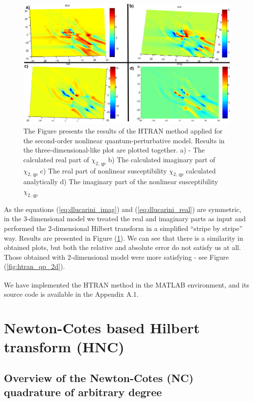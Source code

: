 \documentclass[12pt,twoside,a4paper]{article}
\numberwithin{equation}{subsection}
\numberwithin{figure}{subsection}
\begin{document}
\begin{figure}
  \includegraphics[width=150mm]{img/htran_qp_3d.png}
  \caption{The Figure presents the results of the HTRAN method applied for the second-order nonlinear quantum-perturbative model. Results in the three-dimensional-like plot are plotted together.
     a) - The calculated real part of ${\chi_{2, \, qp}}$ 
     b) The calculated imaginary part of ${\chi_{2, \, qp}}$ 
     c) The real part of nonlinear susceptibility ${\chi_{2, \, qp}}$ calculated analytically 
     d) The imaginary part of the nonlinear susceptibility ${\chi_{2, \, qp}}$
     \label{fig:htran_qp_3d}}
\end{figure}

As the equations (\ref{eq:dlucarini_imag}) and (\ref{eq:dlucarini_real}) are symmetric, in the 3-dimensional model we treated the real and imaginary parts as input and performed the 2-dimensional Hilbert transform in a simplified ``stripe by stripe'' way. Results are presented in Figure (\ref{fig:htran_qp_3d}). We can see that there is a similarity in obtained plots, but both the relative and absolute error do not satisfy us at all. Those obtained with 2-dimensional model were more satisfying - see Figure (\ref{fig:htran_qp_2d}).

We have implemented the HTRAN method in the MATLAB \textsuperscript{\textregistered} environment, and its source code is available in the Appendix A.1.

\section{Newton-Cotes based Hilbert transform (HNC)} \label{chap:nc}

\subsection{Overview of the Newton-Cotes (NC) quadrature of arbitrary degree}  \label{chap:nc_quadrature}
\end{document}
